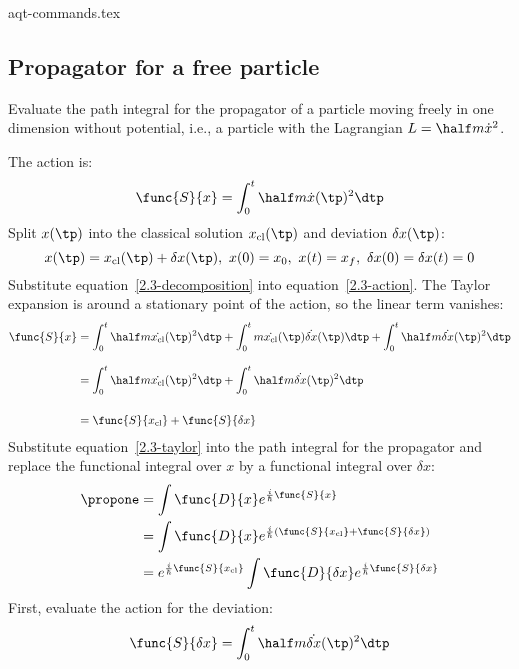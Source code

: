 {aqt-commands.tex}
\newcommand{\xcl}{x_{\text{cl}}}
\newcommand{\xd}{\delta{x}}
\newcommand{\dxd}[1]{\text{d}\xd_{#1}}

\subsection{Propagator for a free particle}

Evaluate the path integral for the propagator of a particle moving freely in
one dimension without potential, i.e., a particle with the Lagrangian $L =
  \half m \dot{x}^2$.

The action is:
\begin{equation}
  \label{2.3-action}
  \func{S}{x} = \int_{0}^{t} \half m \dot{x}(\tp)^2 \dtp
\end{equation}
Split $x(\tp)$ into the classical solution $\xcl(\tp)$ and deviation $\xd(\tp)$:
\begin{equation}
  \label{2.3-decomposition}
  x(\tp) = \xcl(\tp) + \xd(\tp),\
  x(0) = x_0,\
  x(t) = x_f,\
  \xd(0) = \xd(t) = 0
\end{equation}
Substitute equation~\ref{2.3-decomposition} into equation~\ref{2.3-action}.
The Taylor expansion is around a stationary point of the action, so the linear
term vanishes:
\begin{align}
  \label{2.3-taylor}
  \func{S}{x}
   & =
  \int_{0}^{t} \half m \dot{\xcl}(\tp)^2 \dtp +
  \int_{0}^{t} m \dot{\xcl}(\tp)\dot{\xd}(\tp) \dtp +
  \int_{0}^{t} \half m \dot{\xd}(\tp)^2 \dtp
  \nonumber
  \\[2ex]
   & =
  \int_{0}^{t} \half m \dot{\xcl}(\tp)^2 \dtp +
  \int_{0}^{t} \half m \dot{\xd}(\tp)^2 \dtp
  \nonumber
  \\[3ex]
   & =
  \func{S}{\xcl} + \func{S}{\xd}
\end{align}
Substitute equation~\ref{2.3-taylor} into the path integral for the propagator and
replace the functional integral over $x$ by a functional integral over $\xd$:
\begin{align}
  \propone
   & = \int \func{D}{x} e^{\frac{i}{\hbar} \func{S}{x}} \nonumber
  \\
   & = \int \func{D}{x} e^{\frac{i}{\hbar} (\func{S}{\xcl} + \func{S}{\xd})} \nonumber
  \\
  \label{2.3-propagator}
   & = e^{\frac{i}{\hbar} \func{S}{\xcl}} \int \func{D}{\xd} e^{\frac{i}{\hbar} \func{S}{\xd}}
\end{align}
First, evaluate the action for the deviation:
\begin{equation*}
  \func{S}{\xd} = \int_{0}^{t} \half m \dot{\xd}(\tp)^2 \dtp
\end{equation*}
